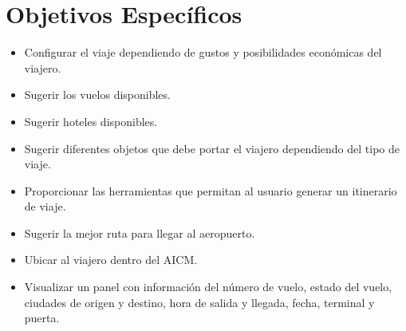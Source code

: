 \section{Objetivos Específicos}

\begin{itemize}
	\item	Configurar el viaje dependiendo de gustos y posibilidades económicas del viajero.
	\item	Sugerir los vuelos disponibles.
	\item 	Sugerir hoteles disponibles. 
	\item	Sugerir diferentes objetos que debe portar el viajero dependiendo del tipo de viaje.
	\item	Proporcionar las herramientas que permitan al usuario generar un itinerario de viaje.
	\item	Sugerir la mejor ruta para llegar al aeropuerto.
	\item	Ubicar al viajero dentro del AICM.
	\item	Visualizar un panel con información del número de vuelo, estado del vuelo,  ciudades de origen y destino, hora de salida y llegada, fecha, terminal y puerta.
\end{itemize}